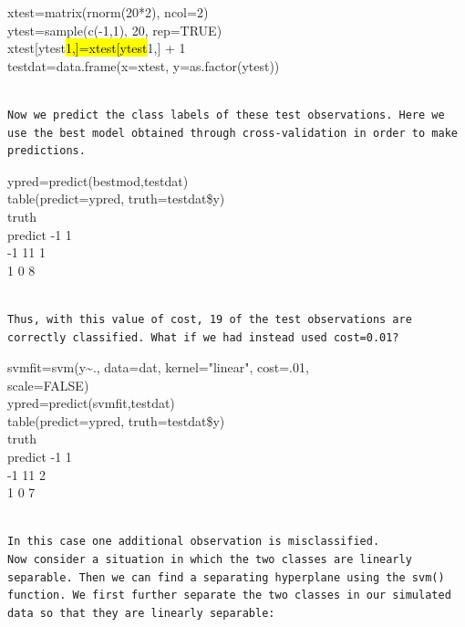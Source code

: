 \documentclass[10pt]{article}
\begin{document}
\begin{displayquote}
xtest=matrix(rnorm(20*2), ncol=2)\\
ytest=sample(c(-1,1), 20, rep=TRUE)\\
xtest[ytest\hl{1,]=xtest[ytest}1,] + 1\\
testdat=data.frame(x=xtest, y=as.factor(ytest))
\end{displayquote}

\begin{verbatim}

Now we predict the class labels of these test observations. Here we use the best model obtained through cross-validation in order to make predictions.
\end{verbatim}

\begin{displayquote}
ypred=predict(bestmod,testdat)\\
table(predict=ypred, truth=testdat\$y)\\
truth\\
predict -1 1\\
-1 11 1\\
1 0 8
\end{displayquote}

\begin{verbatim}

Thus, with this value of cost, 19 of the test observations are correctly classified. What if we had instead used cost=0.01?
\end{verbatim}

\begin{displayquote}
svmfit=svm(y\~{}., data=dat, kernel="linear", cost=.01,\\
scale=FALSE)\\
ypred=predict(svmfit,testdat)\\
table(predict=ypred, truth=testdat\$y)\\
truth\\
predict -1 1\\
-1 11 2\\
1 0 7
\end{displayquote}

\begin{verbatim}

In this case one additional observation is misclassified.
Now consider a situation in which the two classes are linearly separable. Then we can find a separating hyperplane using the svm() function. We first further separate the two classes in our simulated data so that they are linearly separable:
\end{verbatim}
\end{document}

